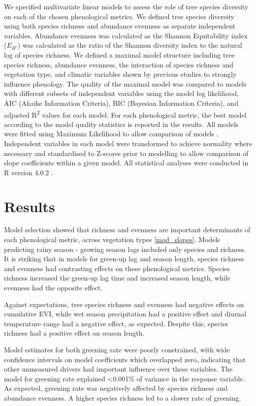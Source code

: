 \documentclass[11pt,a4paper]{article}
\begin{document}
We specified multivariate linear models to assess the role of tree species diversity on each of the chosen phenological metrics. We defined tree species diversity using both species richness and abundance evenness as separate independent variables. Abundance evenness was calculated as the Shannon Equitability index ($E_{H'}$) \citep{Smith1996} was calculated as the ratio of the Shannon diversity index to the natural log of species richness. We defined a maximal model structure including tree species richness, abundance evenness, the interaction of species richness and vegetation type, and climatic variables shown by previous studies to strongly influence phenology. The quality of the maximal model was compared to models with different subsets of independent variables using the model log likelihood, AIC (Akaike Information Criteria), BIC (Bayesian Information Criteria), and adjusted R\textsuperscript{2} values for each model. For each phenological metric, the best model according to the model quality statistics is reported in the results. All models were fitted using Maximum Likelihood to allow comparison of models \citep{}. Independent variables in each model were transformed to achieve normality where necessary and standardised to Z-scores prior to modelling to allow comparison of slope coefficients within a given model. All statistical analyses were conducted in R version 4.0.2 \citep{R2020}.

\section{Results}

Model selection showed that richness and evenness are important determinants of each phenological metric, across vegetation types \autoref{mod_slopes}. Models predicting rainy season - growing season lags included only species and richness. It is striking that in models for green-up lag and season length, species richness and evenness had contrasting effects on these phenological metrics. Species richness increased the green-up lag time and increased season length, while evenness had the opposite effect.

Against expectations, tree species richness and evenness had negative effects on cumulative EVI, while wet season precipitation had a positive effect and diurnal temperature range had a negative effect, as expected. Despite this, species richness had a positive effect on season length.

Model estimates for both greening rate were poorly constrained, with wide confidence intervals on model coefficients which overlapped zero, indicating that other unmeasured drivers had important influence over these variables. The model for greening rate explained <0.001\% of variance in the response variable. As expected, greening rate was negatively affected by species richness and abundance evenness. A higher species richness led to a slower rate of greening. 
\end{document}

